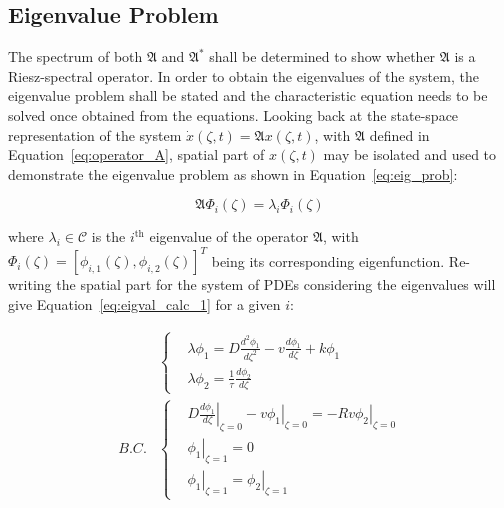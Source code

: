 \subsection{Eigenvalue Problem}
The spectrum of both $\mathfrak{A}$ and $\mathfrak{A}^*$ shall be determined to show whether $\mathfrak{A}$ is a Riesz-spectral operator. In order to obtain the eigenvalues of the system, the eigenvalue problem shall be stated and the characteristic equation needs to be solved once obtained from the equations. Looking back at the state-space representation of the system $\dot{x}(\zeta, t) = \mathfrak{A} x(\zeta, t)$, with $\mathfrak{A}$ defined in Equation~\ref{eq:operator_A}, spatial part of $x(\zeta, t)$ may be isolated and used to demonstrate the eigenvalue problem \autocite{pdebook} as shown in Equation~\ref{eq:eig_prob}:

\begin{equation} \label{eq:eig_prob}
        \mathfrak{A} \Phi_i(\zeta) = \lambda_i \Phi_i(\zeta)
\end{equation}

where $\lambda_i \in \mathcal{C}$ is the $i^{\text{th}}$ eigenvalue of the operator $\mathfrak{A}$, with $\Phi_i(\zeta) = [\phi_{i,1}(\zeta), \phi_{i,2}(\zeta)]^T$ being its corresponding eigenfunction. Re-writing the spatial part for the system of PDEs considering the eigenvalues will give Equation~\ref{eq:eigval_calc_1} for a given $i$:

\begin{equation} \label{eq:eigval_calc_1}
    \begin{aligned}
        &\begin{cases}
            &\lambda \phi_1 = D \frac{d^2 \phi_1}{d \zeta ^2}  - v \frac{d \phi_1}{d \zeta} + k \phi_1 \\
            &\lambda \phi_2 = \frac{1}{\tau} \frac{d \phi_2}{d \zeta}
        \end{cases} \\ B.C. &\begin{cases}
            &D \left. \frac{d \phi_1}{d \zeta} \right|_{\zeta=0} - v \left. \phi_1 \right|_{\zeta=0} = - R v \left. \phi_2 \right|_{\zeta=0} \\
            &\left. \phi_1 \right|_{\zeta=1} = 0 \\
            &\left. \phi_1 \right|_{\zeta=1} = \left. \phi_2 \right|_{\zeta=1}
        \end{cases}
    \end{aligned}
\end{equation}

